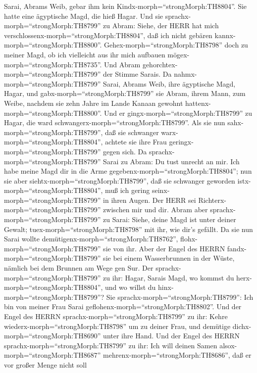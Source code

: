  Sarai, Abrams Weib, gebar ihm kein
Kindx-morph=``strongMorph:TH8804''. Sie hatte eine ägyptische Magd, die
hieß Hagar.  Und sie sprachx-morph=``strongMorph:TH8799'' zu
Abram: Siehe, der HERR hat mich
verschlossenx-morph=``strongMorph:TH8804'', daß ich nicht gebären
kannx-morph=``strongMorph:TH8800''. Gehex-morph=``strongMorph:TH8798''
doch zu meiner Magd, ob ich vielleicht aus ihr mich aufbauen
mögex-morph=``strongMorph:TH8735''. Und Abram
gehorchtex-morph=``strongMorph:TH8799'' der Stimme Sarais. 
Da nahmx-morph=``strongMorph:TH8799'' Sarai, Abrams Weib, ihre
ägyptische Magd, Hagar, und gabx-morph=``strongMorph:TH8799'' sie Abram,
ihrem Mann, zum Weibe, nachdem sie zehn Jahre im Lande Kanaan gewohnt
hattenx-morph=``strongMorph:TH8800''.  Und er
gingx-morph=``strongMorph:TH8799'' zu Hagar, die ward
schwangerx-morph=``strongMorph:TH8799''. Als sie nun
sahx-morph=``strongMorph:TH8799'', daß sie schwanger
warx-morph=``strongMorph:TH8804'', achtete sie ihre Frau
geringx-morph=``strongMorph:TH8799'' gegen sich.  Da
sprachx-morph=``strongMorph:TH8799'' Sarai zu Abram: Du tust unrecht an
mir. Ich habe meine Magd dir in die Arme
gegebenx-morph=``strongMorph:TH8804''; nun sie aber
siehtx-morph=``strongMorph:TH8799'', daß sie schwanger geworden
istx-morph=``strongMorph:TH8804'', muß ich gering
seinx-morph=``strongMorph:TH8799'' in ihren Augen. Der HERR sei
Richterx-morph=``strongMorph:TH8799'' zwischen mir und dir. 
Abram aber sprachx-morph=``strongMorph:TH8799'' zu Sarai: Siehe, deine
Magd ist unter deiner Gewalt; tuex-morph=``strongMorph:TH8798'' mit ihr,
wie dir's gefällt. Da sie nun Sarai wollte
demütigenx-morph=``strongMorph:TH8762'',
flohx-morph=``strongMorph:TH8799'' sie von ihr.  Aber der
Engel des HERRN fandx-morph=``strongMorph:TH8799'' sie bei einem
Wasserbrunnen in der Wüste, nämlich bei dem Brunnen am Wege gen Sur.
 Der sprachx-morph=``strongMorph:TH8799'' zu ihr: Hagar,
Sarais Magd, wo kommst du herx-morph=``strongMorph:TH8804'', und wo
willst du hinx-morph=``strongMorph:TH8799''? Sie
sprachx-morph=``strongMorph:TH8799'': Ich bin von meiner Frau Sarai
geflohenx-morph=``strongMorph:TH8802''.  Und der Engel des
HERRN sprachx-morph=``strongMorph:TH8799'' zu ihr: Kehre
wiederx-morph=``strongMorph:TH8798'' um zu deiner Frau, und demütige
dichx-morph=``strongMorph:TH8690'' unter ihre Hand.  Und
der Engel des HERRN sprachx-morph=``strongMorph:TH8799'' zu ihr: Ich
will deinen Samen alsox-morph=``strongMorph:TH8687''
mehrenx-morph=``strongMorph:TH8686'', daß er vor großer Menge nicht soll
